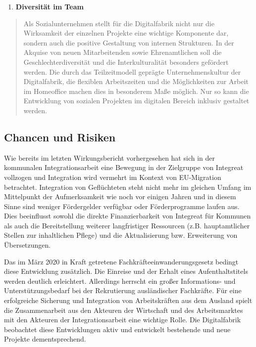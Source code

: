 \documentclass[12pt, a4paper]{article} %
\begin{document}
\begin{enumerate}
\def\labelenumi{\arabic{enumi}.}
\setcounter{enumi}{1}
\item
  \textbf{Diversität im Team}
\end{enumerate}

\begin{quote}
Als Sozialunternehmen stellt für die Digitalfabrik nicht nur die
Wirksamkeit der einzelnen Projekte eine wichtige Komponente dar, sondern
auch die positive Gestaltung von internen Strukturen. In der Akquise von
neuen Mitarbeitenden sowie Ehrenamtlichen soll die
Geschlechterdiversität und die Interkulturalität besonders gefördert
werden. Die durch das Teilzeitmodell geprägte Unternehmenskultur der
Digitalfabrik, die flexiblen Arbeitszeiten und die Möglichkeiten zur
Arbeit im Homeoffice machen dies in besonderem Maße möglich. Nur so kann
die Entwicklung von sozialen Projekten im digitalen Bereich inklusiv
gestaltet werden.
\end{quote}

\hypertarget{chancen-und-risiken}{%
\subsection{Chancen und Risiken}\label{chancen-und-risiken}}

Wie bereits im letzten Wirkungsbericht vorhergesehen hat sich in der
kommunalen Integrationsarbeit eine Bewegung in der Zielgruppe von
Integreat vollzogen und Integration wird vermehrt im Kontext von
EU-Migration betrachtet. Integration von Geflüchteten steht nicht mehr
im gleichen Umfang im Mittelpunkt der Aufmerksamkeit wie noch vor
einigen Jahren und in diesem Sinne sind weniger Fördergelder verfügbar
oder Förderprogramme laufen aus. Dies beeinflusst sowohl die direkte
Finanzierbarkeit von Integreat für Kommunen als auch die Bereitstellung
weiterer langfristiger Ressourcen (z.B. hauptamtlicher Stellen zur
inhaltlichen Pflege) und die Aktualisierung bzw. Erweiterung von
Übersetzungen.

Das im März 2020 in Kraft getretene Fachkräfteeinwanderungsgesetz
bedingt diese Entwicklung zusätzlich. Die Einreise und der Erhalt eines
Aufenthaltstitels werden deutlich erleichtert. Allerdings herrscht ein
großer Informations- und Unterstützungsbedarf bei der Rekrutierung
ausländischer Fachkräfte. Für eine erfolgreiche Sicherung und
Integration von Arbeitskräften aus dem Ausland spielt die Zusammenarbeit
aus den Akteuren der Wirtschaft und des Arbeitsmarktes mit den Akteuren
der Integrationsarbeit eine wichtige Rolle. Die Digitalfabrik beobachtet
diese Entwicklungen aktiv und entwickelt bestehende und neue Projekte
dementsprechend.
\end{document}
